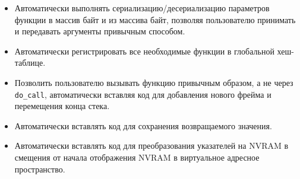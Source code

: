 \documentclass[times,specification,annotation]{itmo-student-thesis}
\begin{document}
\begin{itemize}
    \item Автоматически выполнять сериализацию/десериализацию параметров функции в массив байт и из массива байт, позволяя пользователю принимать и передавать аргументы привычным способом.
    
    \item Автоматически регистрировать все необходимые функции в глобальной хеш-таблице.
    
    \item Позволить пользователю вызывать функцию привычным образом, а не через \texttt{do\_call}, автоматически вставляя код для добавления нового фрейма и перемещения конца стека.
    
    \item Автоматически вставлять код для сохранения возвращаемого значения.
    
    \item Автоматически вставлять код для преобразования указателей на NVRAM в смещения от начала отображения NVRAM в виртуальное адресное пространство.
\end{itemize}

\printmainbibliography

\appendix
\end{document}
